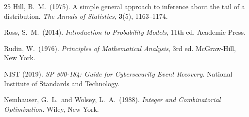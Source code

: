 \documentclass[12pt,a4paper]{article}
\theoremstyle{plain}
\theoremstyle{definition}
\theoremstyle{remark}
\begin{document}
\begin{thebibliography}{25}
Hill, B.\ M.\ (1975).
A simple general approach to inference about the tail of a distribution.
\textit{The Annals of Statistics}, \textbf{3}(5), 1163--1174.

Ross, S.\ M.\ (2014).
\textit{Introduction to Probability Models}, 11th ed.
Academic Press.

Rudin, W.\ (1976).
\textit{Principles of Mathematical Analysis}, 3rd ed.
McGraw-Hill, New York.

NIST (2019).
\textit{SP 800-184: Guide for Cybersecurity Event Recovery}.
National Institute of Standards and Technology.

Nemhauser, G.\ L.\ and Wolsey, L.\ A.\ (1988).
\textit{Integer and Combinatorial Optimization}.
Wiley, New York.

\end{thebibliography}
\end{document}
